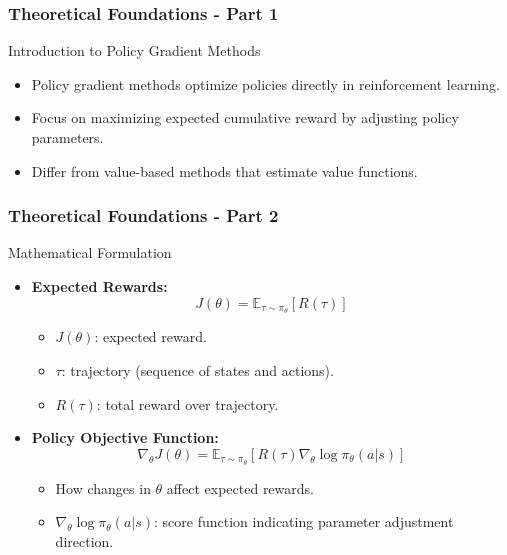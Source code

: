 \documentclass[aspectratio=169]{beamer}
\begin{document}
\begin{frame}[fragile]
    \frametitle{Theoretical Foundations - Part 1}
    \begin{block}{Introduction to Policy Gradient Methods}
        \begin{itemize}
            \item Policy gradient methods optimize policies directly in reinforcement learning.
            \item Focus on maximizing expected cumulative reward by adjusting policy parameters.
            \item Differ from value-based methods that estimate value functions.
        \end{itemize}
    \end{block}
\end{frame}

\begin{frame}[fragile]
    \frametitle{Theoretical Foundations - Part 2}
    \begin{block}{Mathematical Formulation}
        \begin{itemize}
            \item \textbf{Expected Rewards:}
            \[
            J(\theta) = \mathbb{E}_{\tau \sim \pi_\theta} \left[ R(\tau) \right]
            \]
            \begin{itemize}
                \item \(J(\theta)\): expected reward.
                \item \(\tau\): trajectory (sequence of states and actions).
                \item \(R(\tau)\): total reward over trajectory.
            \end{itemize}

            \item \textbf{Policy Objective Function:}
            \[
            \nabla_\theta J(\theta) = \mathbb{E}_{\tau \sim \pi_\theta} \left[ R(\tau) \nabla_\theta \log \pi_\theta(a|s) \right]
            \]
            \begin{itemize}
                \item How changes in \(\theta\) affect expected rewards.
                \item \(\nabla_\theta \log \pi_\theta(a|s)\): score function indicating parameter adjustment direction.
            \end{itemize}
        \end{itemize}
    \end{block}
\end{frame}
\end{document}
